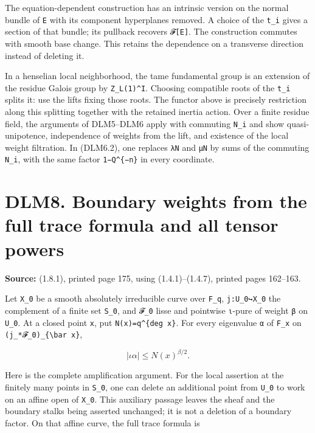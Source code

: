 \documentclass[
]{report}
\begin{document}
The equation-dependent construction has an intrinsic version on the
normal bundle of \texttt{E} with its component hyperplanes removed. A
choice of the \texttt{t\_i} gives a section of that bundle; its pullback
recovers \texttt{𝓕{[}E{]}}. The construction commutes with smooth base
change. This retains the dependence on a transverse direction instead of
deleting it.

In a henselian local neighborhood, the tame fundamental group is an
extension of the residue Galois group by \texttt{Z\_L(1)\^{}I}. Choosing
compatible roots of the \texttt{t\_i} splits it: use the lifts fixing
those roots. The functor above is precisely restriction along this
splitting together with the retained inertia action. Over a finite
residue field, the arguments of DLM5--DLM6 apply with commuting
\texttt{N\_i} and show quasi-unipotence, independence of weights from
the lift, and existence of the local weight filtration. In (DLM6.2), one
replaces \texttt{λN} and \texttt{μN} by sums of the commuting
\texttt{N\_i}, with the same factor \texttt{1−Q\^{}\{−n\}} in every
coordinate.

\section{DLM8. Boundary weights from the full trace formula and all
tensor
powers}\label{dlm8.-boundary-weights-from-the-full-trace-formula-and-all-tensor-powers}

\textbf{Source:} (1.8.1), printed page 175, using (1.4.1)--(1.4.7),
printed pages 162--163.

Let \texttt{X\_0} be a smooth absolutely irreducible curve over
\texttt{F\_q}, \texttt{j:U\_0↪X\_0} the complement of a finite set
\texttt{S\_0}, and \texttt{𝓕\_0} lisse and pointwise \texttt{ι}-pure of
weight \texttt{β} on \texttt{U\_0}. At a closed point \texttt{x}, put
\texttt{N(x)=q\^{}\{deg\ x\}}. For every eigenvalue \texttt{α} of
\texttt{F\_x} on \texttt{(j\_*𝓕\_0)\_\{\textbackslash{}bar\ x\}},

\[
|\iota\alpha|\le N(x)^{\beta/2}.
\tag{DLM8.1}
\]

Here is the complete amplification argument. For the local assertion at
the finitely many points in \texttt{S\_0}, one can delete an additional
point from \texttt{U\_0} to work on an affine open of \texttt{X\_0}.
This auxiliary passage leaves the sheaf and the boundary stalks being
asserted unchanged; it is not a deletion of a boundary factor. On that
affine curve, the full trace formula is
\end{document}
